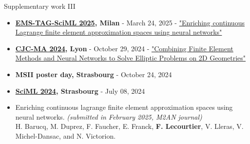 \begin{frame}{Supplementary work III}
    \small
	\begin{tcolorbox}[
		skin=bicolor,
		colback=other, %
		colbacklower=other!20!white,
		title={Posters},
		colframe=title, %
		arc=2mm, %
		boxrule=0.5pt, %
		breakable, enhanced jigsaw,
		width=\linewidth,
		opacityback=0.1
		]
		
        \begin{itemize}[\textcolor{other}{$\blacktriangleright$}]
            \item \textbf{\href{https://www.mate.polimi.it/events/EMS-TAG-SciML-25/index.php}{EMS-TAG-SciML 2025}, Milan} - March 24, 2025 - \href{https://flecourtier.github.io/these2023/these2023/1.0.3/_attachments/poster/2025_03_24.pdf}{"Enriching continuous Lagrange finite element approximation spaces using neural networks"} 
            \item \textbf{\href{https://cjc-ma2024.sciencesconf.org/program?lang=fr}{CJC-MA 2024}, Lyon} - October 29, 2024 - \href{https://flecourtier.github.io/these2023/these2023/1.0.3/_attachments/poster/2024_10_24.pdf}{"Combining Finite Element Methods and Neural Networks to Solve Elliptic Problems on 2D Geometries"}
            \item \textbf{MSII poster day, Strasbourg} - October 24, 2024 \\
			\item \textbf{\href{https://irma.math.unistra.fr/~micheldansac/SciML2024/participants.html}{SciML 2024}, Strasbourg} - July 08, 2024 \\
		\end{itemize}
	\end{tcolorbox}

    \normalsize
    \begin{tcolorbox}[
		skin=bicolor,
		colback=other, %
		colbacklower=other!20!white,
		title={Publications},
		colframe=title, %
		arc=2mm, %
		boxrule=0.5pt, %
		breakable, enhanced jigsaw,
		width=\linewidth,
		opacityback=0.1
		]
		
		\begin{itemize}[\textcolor{other}{$\blacktriangleright$}]
			\item Enriching continuous lagrange finite element approximation spaces using neural networks. \textit{\small(submitted in February 2025, M2AN journal)} \\
			H. Barucq, M. Duprez, F. Faucher, E. Franck, \textbf{F. Lecourtier}, V. Lleras, V. Michel-Dansac, and N. Victorion.
		\end{itemize}
	\end{tcolorbox}
	
\end{frame}

